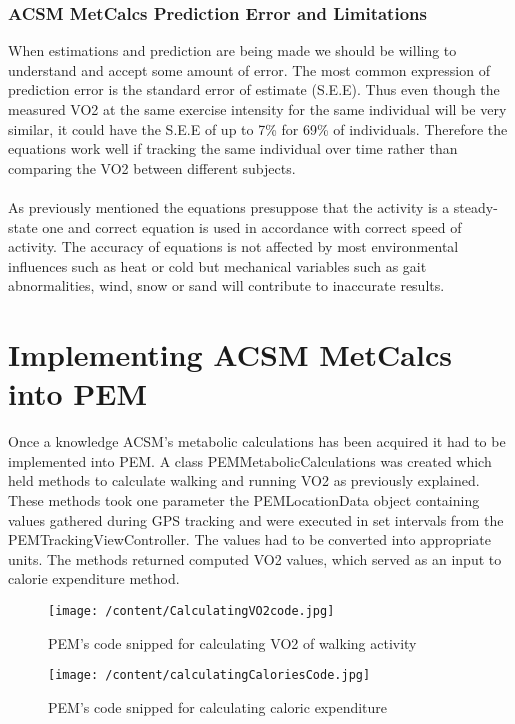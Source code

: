 \documentclass[12pt, a4paper]{report}   %
\begin{document}
\begin{enumerate}
\subsubsection{ACSM MetCalcs Prediction Error and Limitations}
When estimations and prediction are being made we should be willing to understand and accept some amount of error. The most common expression of prediction error is the standard error of estimate (S.E.E). Thus even though the measured VO2 at the same exercise intensity for the same individual will be very similar, it could have the S.E.E of up to 7\% for 69\% of individuals. Therefore the equations work well if tracking the same individual over time rather than comparing the VO2 between different subjects.\\ \\
As previously mentioned the equations presuppose that the activity is a steady-state one and correct equation is used in accordance with correct speed of activity.
The accuracy of equations is not affected by most environmental influences such as heat or cold but mechanical variables such as gait abnormalities, wind, snow or sand will contribute to inaccurate results.\\


\clearpage
\section{Implementing ACSM MetCalcs into PEM}
Once a knowledge ACSM's metabolic calculations has been acquired it had to be implemented into PEM. A class PEMMetabolicCalculations was created which held methods to calculate walking and running VO2 as previously explained. These methods took one parameter the PEMLocationData object containing values gathered during GPS tracking and were executed in set intervals from the PEMTrackingViewController. The values had to be converted into appropriate units. The methods returned computed VO2 values, which served as an input to calorie expenditure method.


\begin{figure}[H]
  \centering
	\texttt{[image: /content/CalculatingVO2code.jpg]}
	  \caption{PEM's code snipped for calculating VO2 of walking activity}
\end{figure}


\begin{figure}[H]
  \centering
	\texttt{[image: /content/calculatingCaloriesCode.jpg]}
	  \caption{PEM's code snipped for calculating caloric expenditure}
\end{figure}


\end{enumerate}
\end{document}

